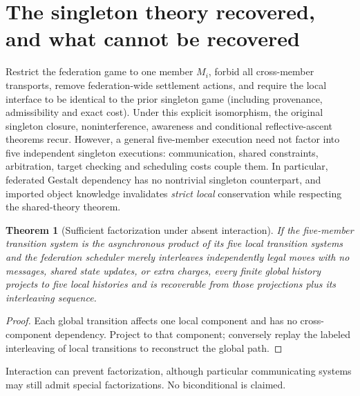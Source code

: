 \documentclass[11pt]{article}
\newtheorem{theorem}{Theorem}[section]
\begin{document}
\section{The singleton theory recovered, and what cannot be recovered}
Restrict the federation game to one member $M_i$, forbid all cross-member transports, remove federation-wide settlement actions, and require the local interface to be identical to the prior singleton game (including provenance, admissibility and exact cost). Under this explicit isomorphism, the original singleton closure, noninterference, awareness and conditional reflective-ascent theorems recur. However, a general five-member execution need not factor into five independent singleton executions: communication, shared constraints, arbitration, target checking and scheduling costs couple them. In particular, federated Gestalt dependency has no nontrivial singleton counterpart, and imported object knowledge invalidates \emph{strict local} conservation while respecting the shared-theory theorem.
\begin{theorem}[Sufficient factorization under absent interaction]
If the five-member transition system is the asynchronous product of its five local transition systems and the federation scheduler merely interleaves independently legal moves with no messages, shared state updates, or extra charges, every finite global history projects to five local histories and is recoverable from those projections plus its interleaving sequence.
\end{theorem}
\begin{proof}Each global transition affects one local component and has no cross-component dependency. Project to that component; conversely replay the labeled interleaving of local transitions to reconstruct the global path.\end{proof}
Interaction can prevent factorization, although particular communicating systems may still admit special factorizations. No biconditional is claimed.
\end{document}
